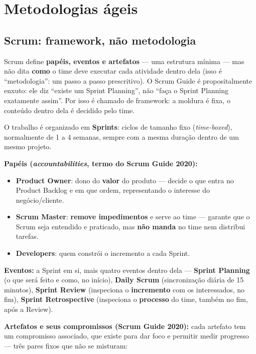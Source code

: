 \section{Metodologias ágeis}

\subsection{Scrum: framework, não metodologia}

\begin{conceito}
Scrum define \textbf{papéis, eventos e artefatos} --- uma estrutura mínima
--- mas não dita \textbf{como} o time deve executar cada atividade dentro
dela (isso é “metodologia”: um passo a passo prescritivo). O Scrum Guide é
propositalmente enxuto: ele diz “existe um Sprint Planning”, não “faça o
Sprint Planning exatamente assim”. Por isso é chamado de framework: a
moldura é fixa, o conteúdo dentro dela é decidido pelo time.

O trabalho é organizado em \textbf{Sprints}: ciclos de tamanho fixo
(\textit{time-boxed}), normalmente de 1 a 4 semanas, sempre com a mesma
duração dentro de um mesmo projeto.

\textbf{Papéis (\textit{accountabilities}, termo do Scrum Guide 2020):}
\begin{itemize}
\item \textbf{Product Owner}: dono do \textbf{valor} do produto --- decide
o que entra no Product Backlog e em que ordem, representando o
interesse do negócio/cliente.
\item \textbf{Scrum Master}: \textbf{remove impedimentos} e serve ao time
--- garante que o Scrum seja entendido e praticado, mas \textbf{não manda}
no time nem distribui tarefas.
\item \textbf{Developers}: quem constrói o incremento a cada Sprint.
\end{itemize}

\textbf{Eventos:} a Sprint em si, mais quatro eventos dentro dela ---
\textbf{Sprint Planning} (o que será feito e como, no início), \textbf{Daily
Scrum} (sincronização diária de 15 minutos), \textbf{Sprint Review}
(inspeciona o \textbf{incremento} com os interessados, no fim), \textbf{Sprint
Retrospective} (inspeciona o \textbf{processo} do time, também no fim, após
a Review).

\textbf{Artefatos e seus compromissos (Scrum Guide 2020):} cada artefato tem
um compromisso associado, que existe para dar foco e permitir medir
progresso --- três pares fixos que não se misturam:


\end{conceito}
